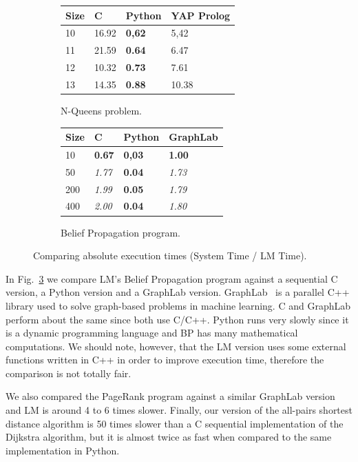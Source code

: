 \begin{figure}[h]
   \vspace{-0.2\intextsep}
   \centering
   
   \begin{subfigure}[b]{0.45\textwidth}
      \resizebox{5cm}{!} {
      \begin{tabular}{ | l | l | l | l |}
       \hline

       Size & C & Python & YAP Prolog \\ \hline\hline
       10 & 16.92 & \textbf{0,62} & 5,42 \\
       11 & 21.59 & \textbf{0.64} & 6.47 \\
       12 & 10.32 & \textbf{0.73} & 7.61 \\
       13 & 14.35 & \textbf{0.88} & 10.38 \\
       \hline
       \end{tabular}}
       \caption{N-Queens problem.}
      \label{comp:nqueens}
   \end{subfigure}
   \begin{subfigure}[b]{0.45\textwidth}
      \resizebox{4.6cm}{!} {
      \begin{tabular}{ | l | l | l | l |}
       \hline

       Size & C & Python & GraphLab \\ \hline\hline
       10 & \textbf{0.67} & \textbf{0,03} & \textbf{1.00} \\
       50 & \textit{1.77} & \textbf{0.04} & \textit{1.73} \\
       200 & \textit{1.99} & \textbf{0.05} & \textit{1.79} \\
       400 & \textit{2.00} & \textbf{0.04} & \textit{1.80} \\
       \hline
       \end{tabular}}
       \caption{Belief Propagation program.}
       \label{comp:bp}
   \end{subfigure}
   \caption{Comparing absolute execution times (System Time / LM Time).}
   \vspace{-0.8\intextsep}
\end{figure}

In Fig.~\ref{comp:bp} we compare LM's Belief Propagation program against a sequential C version, a Python version and a GraphLab version. GraphLab~\cite{GraphLab2010} is a parallel C++ library used to solve graph-based problems in machine learning. C and GraphLab
perform about the same since both use C/C++. Python runs very slowly since it is a dynamic programming language and BP has many
mathematical computations. We should note, however, that the LM version uses some external functions written in C++ in order
to improve execution time, therefore the comparison is not totally fair.

We also compared the PageRank program against a similar GraphLab version and LM is around 4 to 6 times slower.
Finally, our version of the all-pairs shortest distance algorithm is 50 times slower than a C sequential implementation of the Dijkstra algorithm, but it is almost twice as fast when compared to the same implementation in Python.